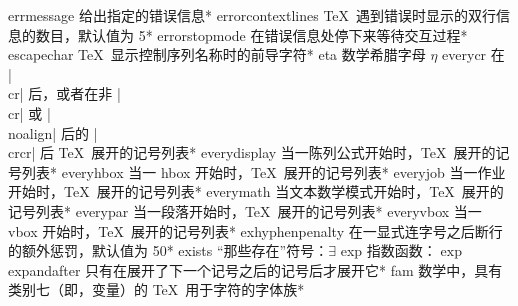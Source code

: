 \capcs errmessage {给出指定的错误信息}*{}
\capcs errorcontextlines {\TeX\ 遇到错误时显示的双行信息的数目，默认值为 5}*{}
\capcs errorstopmode {在错误信息处停下来等待交互过程}*{}
\capcs escapechar {\TeX\ 显示控制序列名称时的前导字符}*{}
\capcs eta {数学希腊字母 $\eta$}{}{}
\capcs everycr {在 |\\cr| 后，或者在非 |\\cr| 或 |\\noalign| 后的 |\\crcr| 后 \TeX\ 展开的记号列表}*{}
\capcs everydisplay {当一陈列公式开始时，\TeX\ 展开的记号列表}*{}
\capcs everyhbox {当一 hbox 开始时，\TeX\ 展开的记号列表}*{}
\capcs everyjob {当一作业开始时，\TeX\ 展开的记号列表}*{}
\capcs everymath {当文本数学模式开始时，\TeX\ 展开的记号列表}*{}
\capcs everypar {当一段落开始时，\TeX\ 展开的记号列表}*{}
\capcs everyvbox {当一 vbox 开始时，\TeX\ 展开的记号列表}*{}
\capcs exhyphenpenalty {在一显式连字号之后断行的额外惩罚，默认值为 50}*{}
\capcs exists {“那些存在”符号：$\exists$}{}{}
\capcs exp {指数函数：$\exp$}{}{}
\capcs expandafter {只有在展开了下一个记号之后的记号后才展开它}*{}
\capcs fam {数学中，具有类别七（即，变量）的 \TeX\ 用于字符的字体族}*{}
